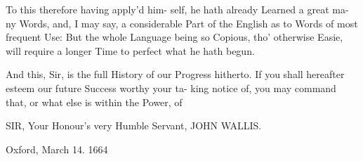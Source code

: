 To this therefore having apply'd him-
self, he hath already Learned a great ma-
ny Words, and, I may say, a considerable
Part of the English as to Words of most
frequent Use: But the whole Language
being so Copious, tho' otherwise Easie,
will require a longer Time to perfect what
he hath begun.

And this, Sir, is the full History of our
Progress hitherto. If you shall hereafter
esteem our future Success worthy your ta-
king notice of, you may command that, or
what else is within the Power, of

SIR, Your Honour's
very Humble Servant,
JOHN WALLIS.

Oxford,
March 14.
1664
